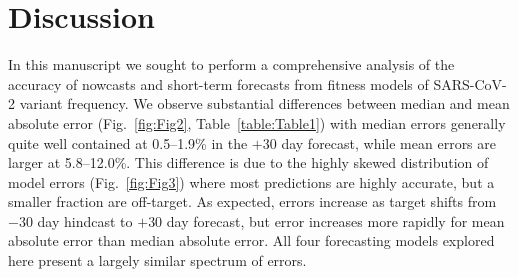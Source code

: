 \documentclass[10pt,letterpaper]{article}
\begin{document}

\section*{Discussion}


In this manuscript we sought to perform a comprehensive analysis of the accuracy of nowcasts and short-term forecasts from fitness models of SARS-CoV-2 variant frequency.
We observe substantial differences between median and mean absolute error (Fig.~\ref{fig:Fig2}, Table~\ref{table:Table1}) with median errors generally quite well contained at 0.5--1.9\% in the $+30$ day forecast, while mean errors are larger at 5.8--12.0\%.
This difference is due to the highly skewed distribution of model errors (Fig.~\ref{fig:Fig3}) where most predictions are highly accurate, but a smaller fraction are off-target.
As expected, errors increase as target shifts from $-30$ day hindcast to $+30$ day forecast, but error increases more rapidly for mean absolute error than median absolute error.
All four forecasting models explored here present a largely similar spectrum of errors.
\end{document}
